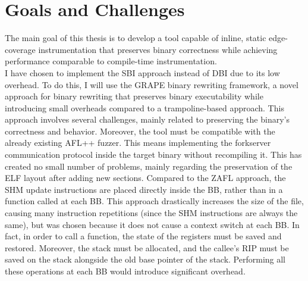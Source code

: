     \section{Goals and Challenges}\label{sec:goals-and-challenges}
    The main goal of this thesis is to develop a tool capable of inline, static edge-coverage instrumentation
    that preserves binary correctness while achieving performance comparable to compile-time instrumentation.\\
    I have chosen to implement the \gls{SBI} approach instead of \gls{DBI} due to its low overhead.
    To do this, I will use the GRAPE binary rewriting framework, a novel approach for binary rewriting that preserves binary executability
    while introducing small overheads compared to a trampoline-based approach.
    This approach involves several challenges, mainly related to preserving the binary's correctness and behavior.
    Moreover, the tool must be compatible with the already existing AFL++ fuzzer.
    This means implementing the forkserver communication protocol inside the target binary without recompiling it.
    This has created no small number of problems, mainly regarding the preservation of the ELF layout after adding new sections.
    Compared to the ZAFL approach, the \gls{SHM} update instructions are placed directly inside the \gls{BB},
    rather than in a function called at each \gls{BB}.
    This approach drastically increases the size of the file, causing many instruction repetitions (since the \gls{SHM}
    instructions are always the same), but was chosen because it does not cause a context switch at each \gls{BB}.
    In fact, in order to call a function, the state of the registers must be saved and restored. Moreover, the stack must be allocated,
    and the callee's RIP must be saved on the stack alongside the old base pointer of the stack.
    Performing all these operations at each \gls{BB} would introduce significant overhead.